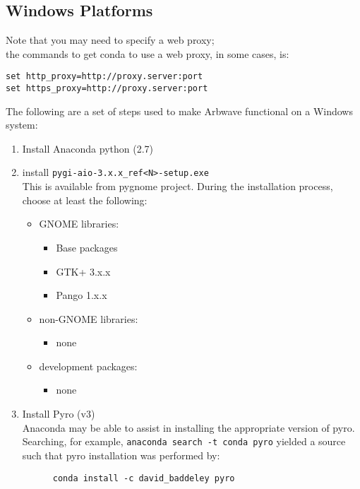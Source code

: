 \subsection{Windows Platforms}

Note that you may need to specify a web proxy;\\
the commands to get conda to use a web proxy, in some cases, is:
\begin{verbatim}
set http_proxy=http://proxy.server:port
set https_proxy=http://proxy.server:port
\end{verbatim}


The following are a set of steps used to make Arbwave functional on a Windows system:
\begin{enumerate}
  \item Install Anaconda python (2.7)
  \item install \verb|pygi-aio-3.x.x_ref<N>-setup.exe| \\
    This is available from pygnome project.
    During the installation process, choose at least the following:
    \begin{itemize}
      \item GNOME libraries:
        \begin{itemize}
          \item Base packages
          \item GTK+ 3.x.x
          \item Pango 1.x.x
        \end{itemize}
      \item non-GNOME libraries:
        \begin{itemize}
          \item none
        \end{itemize}
      \item development packages:
        \begin{itemize}
          \item none
        \end{itemize}
    \end{itemize}

  \item Install Pyro (v3) \\
    Anaconda may be able to assist in installing the appropriate version of pyro.
      Searching, for example, \verb|anaconda search -t conda pyro| yielded a source such
    that pyro installation was performed by:
    \begin{verbatim}
      conda install -c david_baddeley pyro
    \end{verbatim}


\end{enumerate}
